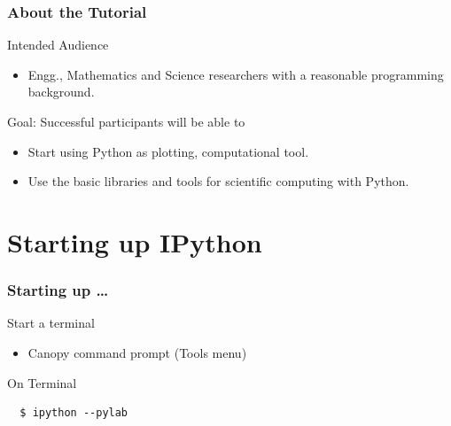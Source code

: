 \documentclass[14pt,compress]{beamer}
\begin{document}
\begin{frame}
  \frametitle{About the Tutorial}
  \begin{block}{Intended Audience}
  \begin{itemize}
       \item Engg., Mathematics and Science researchers with a
           reasonable programming background.
  \end{itemize}
  \end{block}

  \begin{block}{Goal: Successful participants will be able to}
    \begin{itemize}
      \item Start using Python as plotting, computational tool.
      \item Use the basic libraries and tools for scientific computing
          with Python.
    \end{itemize}
  \end{block}
\end{frame}


\section{Starting up IPython}
\begin{frame}[fragile]
\frametitle{Starting up \ldots}
\begin{block}{Start a terminal}
  \begin{itemize}
    \item Canopy command prompt (Tools menu)
\end{itemize}
\end{block}

\begin{block}{On Terminal}
\begin{lstlisting}
  $ ipython --pylab
\end{lstlisting} %
\end{block}
\end{frame}
\end{document}
